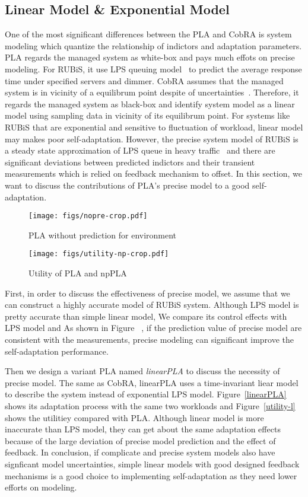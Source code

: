 \documentclass[sigconf]{acmart}
\begin{document}
	\subsection{Linear Model \& Exponential Model}
	One of the most significant differences between the PLA and CobRA is system modeling which quantize the relationship of indictors and adaptation parameters. PLA regards the managed system as white-box and pays much effots on precise modeling. For RUBiS, it use LPS queuing model~\cite{zhang2008steady} to predict the average response time under specified servers and dimmer. CobRA assumes that the managed system is in vicinity of a equilibrum point despite of uncertainties~\cite{Sontag2013}. Therefore, it regards the managed system as black-box and identify system model as a linear model using sampling data in vicinity of its equilibrum point. For systems like RUBiS that are exponential and sensitive to fluctuation of workload, linear model may makes poor self-adaptation. 
	However, the precise system model of RUBiS is a steady state approximation of LPS queue in heavy traffic~\cite{zhang2008steady} and there are significant deviations between predicted indictors and their transient measurements which is relied on feedback mechanism to offset. In this section, we want to discuss the contributions of PLA's precise model to a good self-adaptation. 
	\begin{figure}[!htp]
		\centering
		\texttt{[image: figs/nopre-crop.pdf]}
		\caption{PLA without prediction for environment}
		\label{fig:nopre}
	\end{figure}
	
	\begin{figure}[!htp]
		\centering
		\texttt{[image: figs/utility-np-crop.pdf]}
		\caption{Utility of PLA and npPLA}
		\label{fig:utility-np}
	\end{figure}
	First, in order to discuss the effectiveness of precise model, we assume that we can construct a highly accurate model of RUBiS system. Although LPS model is pretty accurate than simple linear model, We compare its control effects with LPS model and 
	As shown in Figure ~\cite{prePLA}, if the prediction value of precise model are consistent with the measurements, precise modeling can significant improve the self-adaptation performance. 
	
	
	Then we design a variant PLA named \textit{linearPLA} to discuss the necessity of precise model. The same as CobRA, linearPLA uses a time-invariant liear model to describe the system instead of exponential LPS model. 
	Figure~\ref{linearPLA} shows its adaptation process with the same two workloads and Figure~\ref{utility-l} shows the utilitiey compared with PLA. Although linear model is more inaccurate than LPS model, they can get about the same adaptation effects because of the large deviation of precise model prediction and the effect of feedback. In conclusion, if complicate and precise system models also have signficant model uncertainties, simple linear models with good designed feedback mechanisms is a good choice to implementing self-adaptation as they need lower efforts on modeling.
	
\end{document}
